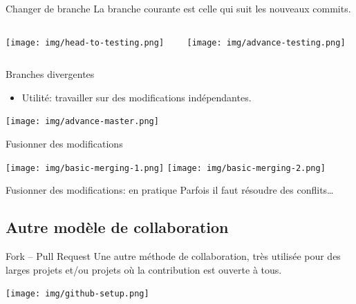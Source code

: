 \documentclass{beamer}
\begin{document}
\begin{frame}{Changer de branche}
    La branche courante est celle qui suit les nouveaux commits.
    \begin{columns}
        \begin{column}{0.44\textwidth}
            \begin{center}
                \texttt{[image: img/head-to-testing.png]}
            \end{center}
        \end{column}
        \begin{column}{0.54\textwidth}
            \texttt{[image: img/advance-testing.png]}
        \end{column}
    \end{columns}
\end{frame}


\begin{frame}{Branches divergentes}
    \begin{itemize}
        \item Utilité: travailler sur des modifications indépendantes.
    \end{itemize}
    \begin{center}
        \texttt{[image: img/advance-master.png]}
    \end{center}
\end{frame}

\begin{frame}{Fusionner des modifications}
    \begin{center}
        \texttt{[image: img/basic-merging-1.png]}
        \texttt{[image: img/basic-merging-2.png]}
    \end{center}
\end{frame}

\begin{frame}{Fusionner des modifications: en pratique}
    Parfois il faut résoudre des conflits\dots
\end{frame}


\subsection{Autre modèle de collaboration}

\begin{frame}{Fork -- Pull Request}
    Une autre méthode de collaboration, très utilisée pour des larges projets
    et/ou projets o\`u la contribution est ouverte à tous.
    \begin{center}
        \texttt{[image: img/github-setup.png]}
    \end{center}
\end{frame}
\end{document}
